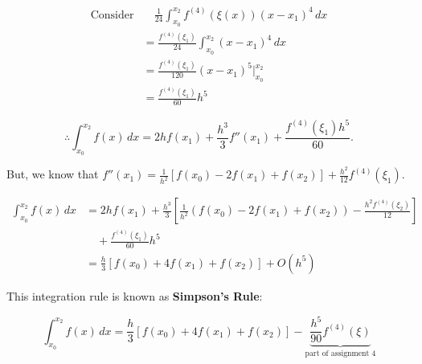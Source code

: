 \begin{align*}
  \text{Consider} &\quad \frac{1}{24} \int_{x_0}^{x_2} f^{(4)}(\xi(x)) (x - x_1)^4 \, dx \\
                  &= \frac{f^{(4)}(\xi_1)}{24} \int_{x_0}^{x_2} (x - x_1)^4 \, dx \\
                  &= \frac{f^{(4)}(\xi_1)}{120} (x - x_1)^5 \Big|_{x_0}^{x_2} \\
                  &= \frac{f^{(4)}(\xi_1)}{60} h^5
\end{align*}

\[
  \therefore 
    \int_{x_0}^{x_2}f(x) \, dx = 2hf(x_1) + \frac{h^3}{3}f''(x_1) +
    \frac{f^{(4)}(\xi_1)h^5}{60}
.\]

But, we know that $\displaystyle f''(x_1) = \frac{1}{h^2} \left[ f(x_0) -2f(x_1) + f(x_2)
\right] + \frac{h^2}{12}f^{(4)}(\xi_1)$.

\begin{align*}
  \int_{x_0}^{x_2}f(x) \, dx &= 2hf(x_1) +
  \frac{h^3}{3}\left[\frac{1}{h^2}(f(x_0) - 2f(x_1) + f(x_2))
  -\frac{h^2 f^{(4)}(\xi_2)}{12} \right] \\
                             &\quad+ \frac{f^{(4)}(\xi_1)}{60}h^5\\
                             &= \frac{h}{3}\left[f(x_0)+4f(x_1)+f(x_2)\right]+O(h^5)
\end{align*}

This integration rule is known as \textbf{Simpson's Rule}:

\[
  \int_{x_0}^{x_2} f(x) \, dx = \frac{h}{3} \left[f(x_0)+4f(x_1)+f(x_2)\right] -
  \underbrace{\frac{h^5}{90}f^{(4)}(\xi)}_{\text{part of assignment 4}}
\]


